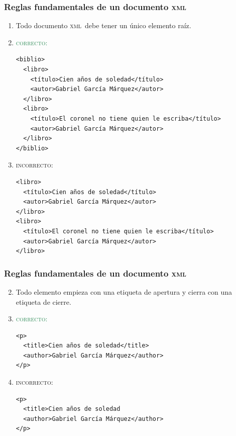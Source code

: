 \documentclass[%
  handout, %
  ]{beamer}
\newcommand*{\rojo}[1]{\textcolor[HTML]{8B0000}{#1}}
\newcommand*{\verde}[1]{\textcolor{seagreen}{#1}}
\newcommand*{\XML}{\textsc{xml}}
\begin{document}
\begin{frame}[fragile]
  \frametitle{Reglas fundamentales de un documento \XML}
  \begin{enumerate}
    \item Todo documento \XML\ debe tener un único elemento raíz.
      \scriptsize
    \item[] \verde{\textsc{correcto}:}
\begin{verbatim}
<biblio>
  <libro>
    <título>Cien años de soledad</título>
    <autor>Gabriel García Márquez</autor>
  </libro>
  <libro>
    <título>El coronel no tiene quien le escriba</título>
    <autor>Gabriel García Márquez</autor>
  </libro>
</biblio>
\end{verbatim}

    \item[] \rojo{\textsc{incorrecto}:}
       \scriptsize
\begin{verbatim}
<libro>
  <título>Cien años de soledad</título>
  <autor>Gabriel García Márquez</autor>
</libro>
<libro>
  <título>El coronel no tiene quien le escriba</título>
  <autor>Gabriel García Márquez</autor>
</libro>
\end{verbatim}
  \end{enumerate}
\end{frame}

\begin{frame}[fragile]
  \frametitle{Reglas fundamentales de un documento \XML}
  \begin{enumerate}
      \setcounter{enumi}{1}  
    \item Todo elemento empieza con una etiqueta de apertura y cierra con una etiqueta de cierre.

    \item[] \verde{\textsc{correcto}:}
\begin{verbatim}
<p>
  <title>Cien años de soledad</title>
  <author>Gabriel García Márquez</author>
</p>
\end{verbatim}

    \item[] \rojo{\textsc{incorrecto}:}
\begin{verbatim}
<p>
  <title>Cien años de soledad
  <author>Gabriel García Márquez</author>
</p>
\end{verbatim}
      
  \end{enumerate}
\end{frame}
\end{document}
